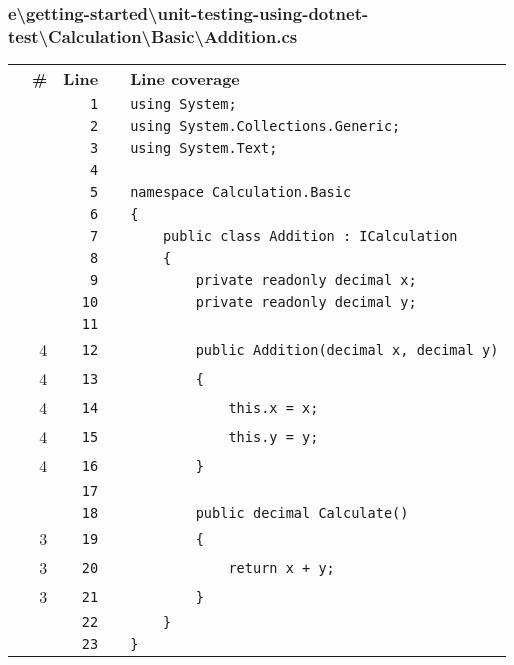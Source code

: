\documentclass[a4paper,landscape,10pt]{article}
\begin{document}
\subsubsection{e\textbackslash getting-started\textbackslash unit-testing-using-dotnet-test\textbackslash Calculation\textbackslash Basic\textbackslash Addition.cs}
\begin{longtable}[l]{lrrll}
\textbf{} & \textbf{\#} & \textbf{Line} & \textbf{} & \textbf{Line coverage}\\
\cellcolor{gray} &  & \verb~1~ & & \verb~using System;~\\
\cellcolor{gray} &  & \verb~2~ & & \verb~using System.Collections.Generic;~\\
\cellcolor{gray} &  & \verb~3~ & & \verb~using System.Text;~\\
\cellcolor{gray} &  & \verb~4~ & & \verb~~\\
\cellcolor{gray} &  & \verb~5~ & & \verb~namespace Calculation.Basic~\\
\cellcolor{gray} &  & \verb~6~ & & \verb~{~\\
\cellcolor{gray} &  & \verb~7~ & & \verb~    public class Addition : ICalculation~\\
\cellcolor{gray} &  & \verb~8~ & & \verb~    {~\\
\cellcolor{gray} &  & \verb~9~ & & \verb~        private readonly decimal x;~\\
\cellcolor{gray} &  & \verb~10~ & & \verb~        private readonly decimal y;~\\
\cellcolor{gray} &  & \verb~11~ & & \verb~~\\
\cellcolor{green} & 4 & \verb~12~ & & \verb~        public Addition(decimal x, decimal y)~\\
\cellcolor{green} & 4 & \verb~13~ & & \verb~        {~\\
\cellcolor{green} & 4 & \verb~14~ & & \verb~            this.x = x;~\\
\cellcolor{green} & 4 & \verb~15~ & & \verb~            this.y = y;~\\
\cellcolor{green} & 4 & \verb~16~ & & \verb~        }~\\
\cellcolor{gray} &  & \verb~17~ & & \verb~~\\
\cellcolor{gray} &  & \verb~18~ & & \verb~        public decimal Calculate()~\\
\cellcolor{green} & 3 & \verb~19~ & & \verb~        {~\\
\cellcolor{green} & 3 & \verb~20~ & & \verb~            return x + y;~\\
\cellcolor{green} & 3 & \verb~21~ & & \verb~        }~\\
\cellcolor{gray} &  & \verb~22~ & & \verb~    }~\\
\cellcolor{gray} &  & \verb~23~ & & \verb~}~\\
\end{longtable}
\newpage
\end{document}
